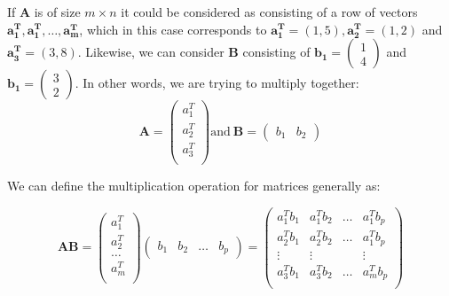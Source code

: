If \textbf{A} is of size $m \times n$ it could be considered as consisting of a row of vectors $\boldsymbol{a_{1}^{T}}, \boldsymbol{a_{1}^{T}}, \ldots, \boldsymbol{a_{m}^{T}}$, which in this case corresponds to $\boldsymbol{a_{1}^{T}} = (1,5), \boldsymbol{a_{2}^{T}} = (1,2)$ and $\boldsymbol{a_{3}^{T}} = (3,8)$.   Likewise, we can consider $\mathbf{B}$ consisting of $\boldsymbol{b_{1}} = \left( \begin{array}{r} 1\\4 \end{array} \right)$ and  $\boldsymbol{b_{1}} = \left( \begin{array}{r} 3\\2 \end{array} \right)$.   In other words, we are trying to multiply together:
\begin{displaymath}
\mathbf{A} = 
\left( \begin{array}{r}
a_{1}^{T} \\
a_{2}^{T}\\
a_{3}^{T}\\
\end{array}
\right)
\mbox{and}\ \mathbf{B} = 
\left( \begin{array}{rr}
b_{1} & b_{2}
\end{array}
\right)
\end{displaymath}


We can define the multiplication operation for matrices generally as:

\begin{displaymath}
\mathbf{AB} = 
\left( \begin{array}{r}
a_{1}^{T} \\
a_{2}^{T}\\
\ldots\\
a_{m}^{T}\\
\end{array}
\right)
\left( \begin{array}{rrrr}
b_{1} & b_{2} & \ldots & b_{p}
\end{array}
\right)
=
\left( \begin{array}{rrrr}
a_{1}^{T}b_{1} & a_{1}^{T}b_{2} & \ldots & a_{1}^{T}b_{p} \\
a_{2}^{T}b_{1} & a_{2}^{T}b_{2} & \ldots &  a_{1}^{T}b_{p}\\
\vdots & \vdots & & \vdots  \\
a_{3}^{T}b_{1} & a_{3}^{T}b_{2} & \ldots &  a_{m}^{T}b_{p}\\
\end{array}
\right)
\end{displaymath}

